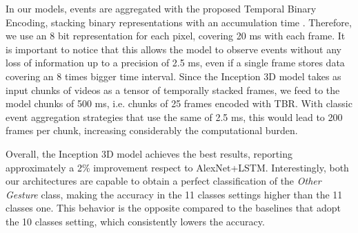 \documentclass[a4paper,conference]{IEEEtran}
\begin{document}
In our models, events are aggregated with the proposed Temporal Binary Encoding, stacking  binary representations with an accumulation time . Therefore, we use an 8 bit representation for each pixel, covering 20 ms with each frame. It is important to notice that this allows the model to observe events without any loss of information up to a precision of 2.5 ms, even if a single frame stores data covering an 8 times bigger time interval.
Since the Inception 3D model takes as input chunks of videos as a tensor of temporally stacked frames, we feed to the model chunks of 500 ms, i.e. chunks of 25 frames encoded with TBR. With classic event aggregation strategies that use the same  of 2.5 ms, this would lead to 200 frames per chunk, increasing considerably the computational burden.

Overall, the Inception 3D model achieves the best results, reporting approximately a 2\% improvement respect to AlexNet+LSTM. Interestingly, both our architectures are capable to obtain a perfect classification of the \textit{Other Gesture} class, making the accuracy in the 11 classes settings higher than the 11 classes one. This behavior is the opposite compared to the baselines that adopt the 10 classes setting, which consistently lowers the accuracy.
\end{document}
